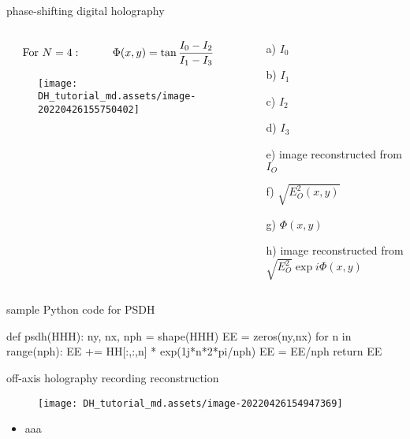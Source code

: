 \documentclass[t, aspectratio=169]{beamer}
\begin{document}
\begin{frame}{phase-shifting digital holography}
	\begin{columns}
		\begin{column}{0.5\textwidth}
			\vspace{-5 mm}
\[ \textrm{For  } N=4:\hspace{10 mm} \Phi(x,y) = \tan\frac{I_0 - I_2}{I_1 - I_3} \]	
			\begin{figure}
				\texttt{[image: DH\_tutorial\_md.assets/image-20220426155750402]}
			\end{figure}
		\end{column}
		\begin{column}{0.5\textwidth}		
		\begin{itemize}
			\item[a)] $ I_0 $
			\item[b)] $ I_1 $
			\item[c)] $ I_2 $
			\item[d)] $ I_3 $
			\item[e)] image reconstructed from $ I_O $
			\item[f)] $ \sqrt{E_O^2(x,y)}
			 $
			\item[g)] $ \Phi(x,y) $
			\item[h)] image reconstructed from $ \sqrt{E_O^2}\exp{i\Phi(x,y)} $
		\end{itemize}	
		\end{column}
	\end{columns}
\end{frame}


\begin{frame}[fragile]{sample Python code for PSDH}
	\begin{semiverbatim}
def psdh(HHH):
	ny, nx, nph = shape(HHH)
	EE = zeros(ny,nx)
	for n in range(nph):
		EE += HH[:,:,n] * exp(1j*n*2*pi/nph)
    EE = EE/nph
    return EE
	\end{semiverbatim}
\end{frame}


\begin{frame}{off-axis holography}
	\hspace{30 mm} recording \hspace{50 mm} reconstruction
	\begin{figure}
		\texttt{[image: DH\_tutorial\_md.assets/image-20220426154947369]}
	\end{figure}
	\begin{itemize}
		\item aaa
	\end{itemize}
\end{frame}
\end{document}
